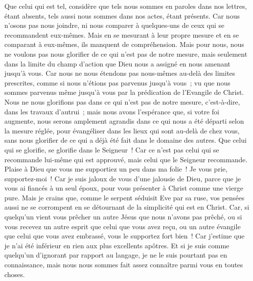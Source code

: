 \begin{multicols}{2}
Que celui qui est tel, considère que tels nous sommes en paroles dans nos lettres, étant absents, tels aussi nous sommes dans nos actes, étant présents.
Car nous n'osons pas nous joindre, ni nous comparer à quelques-uns de ceux qui se recommandent eux-mêmes. Mais en se mesurant à leur propre mesure et en se comparant à eux-mêmes, ils manquent de compréhension.
Mais pour nous, nous ne voulons pas nous glorifier de ce qui n'est pas de notre mesure, mais seulement dans la limite du champ d'action que Dieu nous a assigné en nous amenant jusqu'à vous.
Car nous ne nous étendons pas nous-mêmes au-delà des limites prescrites, comme si nous n'étions pas parvenus jusqu'à vous~; vu que nous sommes parvenus même jusqu'à vous par la prédication de l'Evangile de Christ.
Nous ne nous glorifions pas dans ce qui n'est pas de notre mesure, c'est-à-dire, dans les travaux d'autrui~; mais nous avons l'espérance que, si votre foi augmente, nous serons amplement agrandis dans ce qui nous a été départi selon la mesure réglée,
pour évangéliser dans les lieux qui sont au-delà de chez vous, sans nous glorifier de ce qui a déjà été fait dans le domaine des autres.
Que celui qui se glorifie, se glorifie dans le Seigneur~!
Car ce n'est pas celui qui se recommande lui-même qui est approuvé, mais celui que le Seigneur recommande.
\VerseOne{}Plaise à Dieu que vous me supportiez un peu dans ma folie~! Je vous prie, supportez-moi~!
Car je suis jaloux de vous d'une jalousie de Dieu, parce que je vous ai fiancés à un seul époux, pour vous présenter à Christ comme une vierge pure.
Mais je crains que, comme le serpent séduisit Eve par sa ruse, vos pensées aussi ne se corrompent en se détournant de la simplicité qui est en Christ.
Car, si quelqu'un vient vous prêcher un autre Jésus que nous n'avons pas prêché, ou si vous recevez un autre esprit que celui que vous avez reçu, ou un autre évangile que celui que vous avez embrassé, vous le supportez fort bien~!
Car j'estime que je n'ai été inférieur en rien aux plus excellents apôtres.
Et si je suis comme quelqu'un d'ignorant par rapport au langage, je ne le suis pourtant pas en connaissance, mais nous nous sommes fait assez connaître parmi vous en toutes choses.

\end{multicols}
